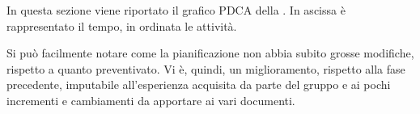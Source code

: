 		In questa sezione viene riportato il grafico PDCA della . In ascissa è rappresentato il tempo, in ordinata le attività.


		Si può facilmente notare come la pianificazione non abbia subito grosse modifiche, rispetto a quanto preventivato. Vi è, quindi, un miglioramento, rispetto alla fase precedente, imputabile all'esperienza acquisita da parte del gruppo e ai pochi incrementi e cambiamenti da apportare ai vari documenti.